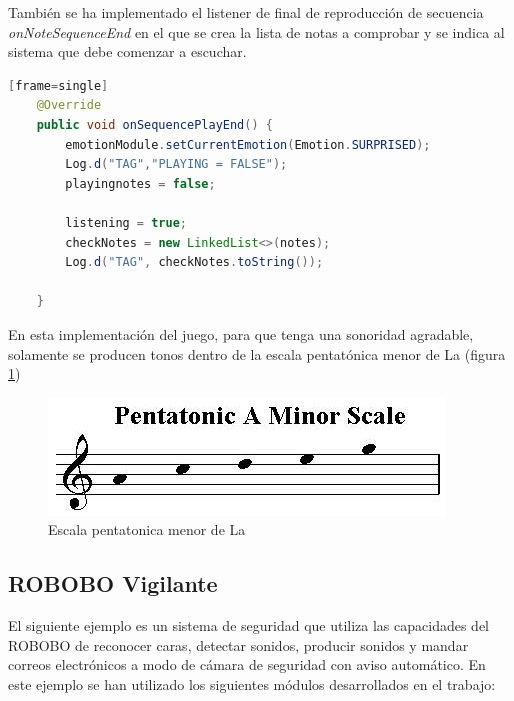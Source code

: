 \vspace{5mm} %

También se ha implementado el listener de final de reproducción de secuencia \textit{onNoteSequenceEnd} en el que se crea la lista de notas a comprobar y se indica al sistema que debe comenzar a escuchar.

\vspace{5mm} %

\begin{lstlisting}[language=Java][frame=single]
    @Override
    public void onSequencePlayEnd() {
        emotionModule.setCurrentEmotion(Emotion.SURPRISED);
        Log.d("TAG","PLAYING = FALSE");
        playingnotes = false;

        listening = true;
        checkNotes = new LinkedList<>(notes);
        Log.d("TAG", checkNotes.toString());

    }
\end{lstlisting}

\vspace{5mm} %

En esta implementación del juego, para que tenga una sonoridad agradable, solamente se producen tonos dentro de la escala pentatónica menor de La (figura \ref{fig:pentatonic-scale})

\begin{figure}
	\centering
	\includegraphics[width=0.6\linewidth]{imagenes/pentatonic-scale-a-minor.jpg}
	\caption{Escala pentatonica menor de La}
	\label{fig:pentatonic-scale}
\end{figure} 


\subsection{ROBOBO Vigilante}
\label{subsec:robobo-vigilante}
El siguiente ejemplo es un sistema de seguridad que utiliza las capacidades del ROBOBO de reconocer caras, detectar sonidos, producir sonidos y mandar correos electrónicos a modo de cámara de seguridad con aviso automático.
En este ejemplo se han utilizado los siguientes módulos desarrollados en el trabajo:

